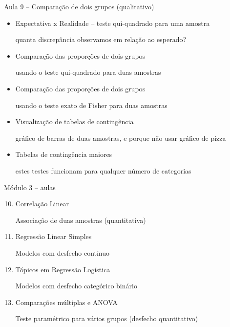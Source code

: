 \documentclass{beamer}
\begin{document}
\begin{frame}{\scriptsize Aula 9 -- Comparação de dois grupos (qualitativo)}
  \begin{itemize}
    \footnotesize
  \item Expectativa x Realidade -- teste qui-quadrado para uma amostra

    {\tiny quanta discrepância observamos em relação ao esperado?}
    \bigskip
  \item Comparação das proporções de dois grupos

    {\tiny usando o teste qui-quadrado para duas amostras}
    \bigskip
  \item Comparação das proporções de dois grupos

    {\tiny usando o teste exato de Fisher para duas amostras}
    \bigskip
  \item Visualização de tabelas de contingência

    {\tiny gráfico de barras de duas amostras, e porque não usar gráfico de pizza}
    \bigskip
  \item Tabelas de contingência maiores

    {\tiny estes testes funcionam para qualquer número de categorias}
  \end{itemize}
\end{frame}

\begin{frame}{\scriptsize Módulo 3 -- aulas}
  \begin{enumerate}
    \setcounter{enumi}{9}
  \item Correlação Linear

    {\tiny Associação de duas amostras (quantitativa)}
    \bigskip
  \item Regressão Linear Simples

    {\tiny Modelos com desfecho contínuo}
    \bigskip
  \item Tópicos em Regressão Logística

    {\tiny Modelos com desfecho categórico binário}
    \bigskip
  \item Comparações múltiplas e ANOVA

    {\tiny Teste paramétrico para vários grupos (desfecho quantitativo)}
  \end{enumerate}
\end{frame}
\end{document}
